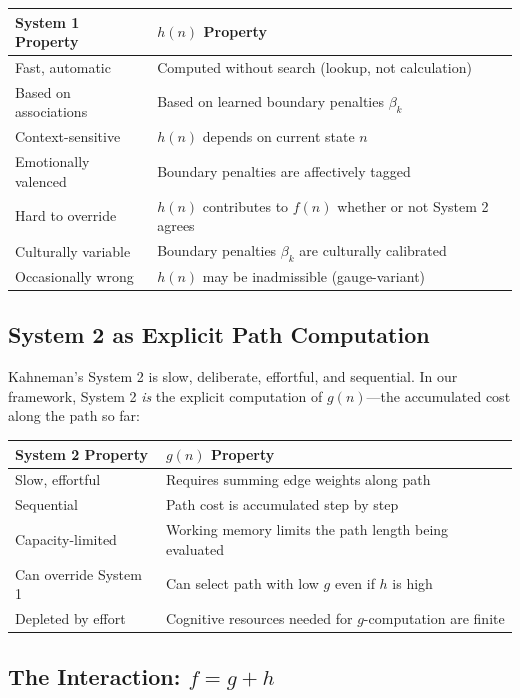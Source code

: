 \documentclass[12pt]{article}
\theoremstyle{definition}
\theoremstyle{remark}
\begin{document}
\begin{center}
\begin{tabular}{ll}
\toprule
\textbf{System 1 Property} & \textbf{$h(n)$ Property} \\
\midrule
Fast, automatic & Computed without search (lookup, not calculation) \\
Based on associations & Based on learned boundary penalties $\beta_k$ \\
Context-sensitive & $h(n)$ depends on current state $n$ \\
Emotionally valenced & Boundary penalties are affectively tagged \\
Hard to override & $h(n)$ contributes to $f(n)$ whether or not System 2 agrees \\
Culturally variable & Boundary penalties $\beta_k$ are culturally calibrated \\
Occasionally wrong & $h(n)$ may be inadmissible (gauge-variant) \\
\bottomrule
\end{tabular}
\end{center}

\subsection{System 2 as Explicit Path Computation}

Kahneman's System 2 is slow, deliberate, effortful, and sequential.  In our framework, System 2 \emph{is} the explicit computation of $g(n)$---the accumulated cost along the path so far:

\begin{center}
\begin{tabular}{ll}
\toprule
\textbf{System 2 Property} & \textbf{$g(n)$ Property} \\
\midrule
Slow, effortful & Requires summing edge weights along path \\
Sequential & Path cost is accumulated step by step \\
Capacity-limited & Working memory limits the path length being evaluated \\
Can override System 1 & Can select path with low $g$ even if $h$ is high \\
Depleted by effort & Cognitive resources needed for $g$-computation are finite \\
\bottomrule
\end{tabular}
\end{center}

\subsection{The Interaction: $f = g + h$}
\end{document}
